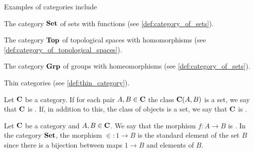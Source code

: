 \begin{example}\label{ex:categories}
  Examples of categories include

  \begin{defenum}
    \item The category $\operatorname{\mathbf{Set}}$ of sets with functions (see \cref{def:category_of_sets}).
    \item The category $\operatorname{\mathbf{Top}}$ of topological spaces with homomorphisms (see \cref{def:category_of_topological_spaces}).
    \item The category $\operatorname{\mathbf{Grp}}$ of groups with homeomorphisms (see \cref{def:category_of_sets}).
    \item Thin categories (see \cref{def:thin_category}).
  \end{defenum}
\end{example}

\begin{definition}\label{def:category_cardinality}
  Let $\operatorname{\mathbf{C}}$ be a category. If for each pair $A, B \in \operatorname{\mathbf{C}}$ the class $\operatorname{\mathbf{C}}(A, B)$ is a set, we say that $\operatorname{\mathbf{C}}$ is . If, in addition to this, the class of objects is a set, we say that $\operatorname{\mathbf{C}}$ is .
\end{definition}

\begin{definition}\label{def:generalized_element}\cite[definition 4.1.25]{Leinster2014}
  Let $\operatorname{\mathbf{C}}$ be a category and $A, B \in \operatorname{\mathbf{C}}$. We say that the morphism $f: A \to B$ is . In the category $\operatorname{\mathbf{Set}}$, the morphism $\in : 1 \to B$ is the standard element of the set $B$ since there is a bijection between maps $1 \to B$ and elements of $B$.
\end{definition}

